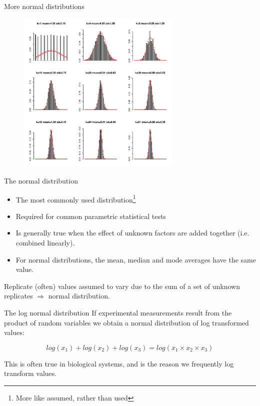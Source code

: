 \documentclass[pdf]{beamer}
\begin{document}
\begin{frame}{More normal distributions}
  \begin{figure}[ht]
    \includegraphics[width=0.7\textwidth]{images/dist3}
  \end{figure}

\end{frame}

\begin{frame}{The normal distribution}
\begin{itemize}
\item The most commonly used distribution\footnote{More like assumed, rather than used}
\item Required for common parametric statistical tests
\item Is generally true when the effect of unknown factors are added together
  (i.e. combined linearly).
\item For normal distributions, the mean, median and mode averages have the
  same value.
\end{itemize}

\footnotesize
Replicate (often) values assumed to vary due to the sum of a set of unknown
replicates $\Rightarrow$ normal distribution.
\end{frame}

\begin{frame}{The log normal distribution}
  If experimental measurements result from the product of random variables we
  obtain a normal distribution of log transformed values:

  $$
  log(x_1) + log(x_2) + log(x_3) = log( x_1 \times x_2 \times x_3 )
  $$
  
  This is often true in biological systems, and is the reason we frequently log
  transform values.

\end{frame}
\end{document}
